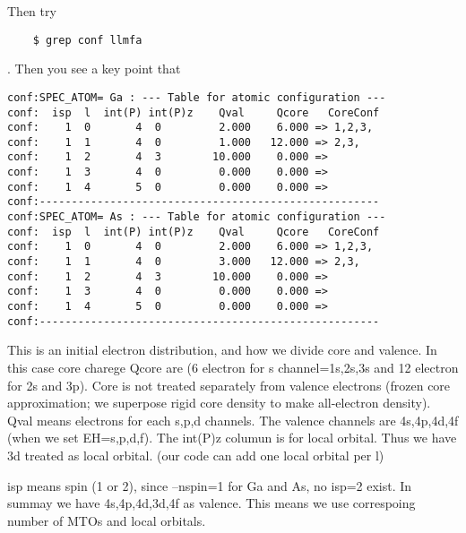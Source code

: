 \documentclass[a4paper,10pt,epsf,fleqn]{article}
\begin{document}
Then try
\begin{verbatim}
    $ grep conf llmfa
\end{verbatim}
. Then you see a key point that
\begin{verbatim}
conf:SPEC_ATOM= Ga : --- Table for atomic configuration ---
conf:  isp  l  int(P) int(P)z    Qval     Qcore   CoreConf
conf:    1  0       4  0         2.000    6.000 => 1,2,3,
conf:    1  1       4  0         1.000   12.000 => 2,3,
conf:    1  2       4  3        10.000    0.000 => 
conf:    1  3       4  0         0.000    0.000 => 
conf:    1  4       5  0         0.000    0.000 => 
conf:-----------------------------------------------------
conf:SPEC_ATOM= As : --- Table for atomic configuration ---
conf:  isp  l  int(P) int(P)z    Qval     Qcore   CoreConf
conf:    1  0       4  0         2.000    6.000 => 1,2,3,
conf:    1  1       4  0         3.000   12.000 => 2,3,
conf:    1  2       4  3        10.000    0.000 => 
conf:    1  3       4  0         0.000    0.000 => 
conf:    1  4       5  0         0.000    0.000 => 
conf:-----------------------------------------------------
\end{verbatim}
This is an initial electron distribution, and how we divide 
core and valence. In this case core charege Qcore are (6 electron for s channel=1s,2s,3s
and 12 electron for 2s and 3p). Core is not treated separately from valence electrons
(frozen core approximation; we superpose rigid core density to make
all-electron density). Qval means electrons for each s,p,d channels.
The valence channels are 4s,4p,4d,4f (when we set EH=s,p,d,f). 
The int(P)z columun is for local orbital. Thus we have 3d treated as
local orbital. (our code can add one local orbital per l)

isp means spin (1 or 2), since --nspin=1 for Ga and As, no isp=2 exist.
In summay we have 4s,4p,4d,3d,4f as valence. 
This means we use correspoing number of MTOs and local orbitals.
\end{document}
